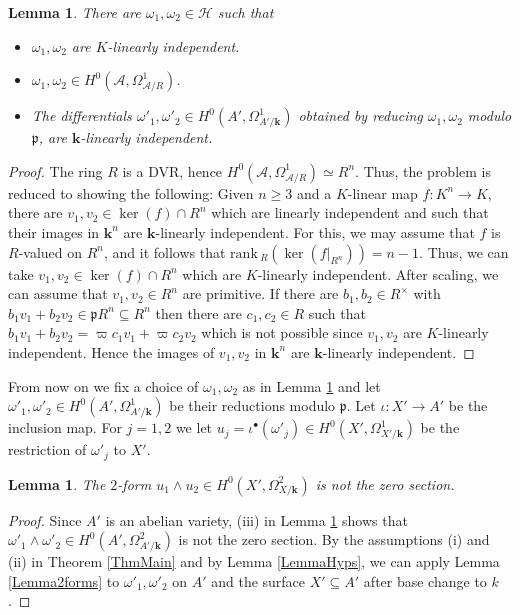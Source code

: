 \documentclass[11pt]{amsart}
\newtheorem{lemma}[theorem]{Lemma}
\theoremstyle{remark}
\numberwithin{equation}{section}
\newcommand{\pfrak}{\mathfrak{p}}
\newcommand{\Acal}{\mathscr{A}}
\newcommand{\Hcal}{\mathscr{H}}
\newcommand{\kk}{\mathbf{k}}
\newcommand{\rk}{\mathrm{rank}\,}
\begin{document}
\begin{lemma}\label{LemmaDiff1} There are $\omega_1,\omega_2\in \Hcal$ such that
\begin{itemize}
\item[(i)] $\omega_1,\omega_2$ are $K$-linearly independent.
\item[(ii)] $\omega_1,\omega_2\in H^0(\Acal,\Omega^1_{\Acal/R})$.
\item[(iii)] The differentials $\omega'_1,\omega'_2\in H^0(A',\Omega^1_{A'/\kk})$ obtained by reducing $\omega_1,\omega_2$ modulo $\pfrak$, are $\kk$-linearly independent.
\end{itemize}
\end{lemma}
\begin{proof} The ring $R$ is a DVR, hence $H^0(\Acal,\Omega^1_{\Acal/R})\simeq R^n$. Thus, the problem is reduced to showing the following: Given $n\ge 3$ and a $K$-linear map $f:K^n\to K$, there are $v_1,v_2\in \ker(f)\cap R^n$ which are linearly independent and such that their images in $\kk^n$ are $\kk$-linearly independent. For this, we may assume that $f$ is $R$-valued on $R^n$, and it follows that $\rk_R(\ker(f|_{R^n}))=n-1$. Thus, we can take $v_1,v_2\in \ker(f)\cap R^n$ which are $K$-linearly independent. After scaling, we can assume that $v_1,v_2\in R^n$ are primitive. If there are $b_1,b_2\in R^\times$ with $b_1 v_1+b_2 v_2\in \pfrak R^n\subseteq R^n$ then there are $c_1,c_2\in R$ such that $b_1 v_1+b_2 v_2=\varpi c_1 v_1+\varpi c_2v_2$ which is not possible since $v_1,v_2$ are $K$-linearly independent. Hence the images of  $v_1,v_2$ in $\kk^n$ are $\kk$-linearly independent.
\end{proof}

From now on we fix a choice of $\omega_1,\omega_2$ as in Lemma \ref{LemmaDiff1} and let $\omega'_1,\omega'_2\in H^0(A',\Omega^1_{A'/\kk})$ be their reductions modulo $\pfrak$. Let $\iota:X'\to A'$ be the inclusion map. For $j=1,2$ we let $u_j=\iota^\bullet(\omega'_j)\in H^0(X',\Omega^1_{X'/\kk})$ be the restriction of $\omega'_j$ to $X'$.

\begin{lemma}\label{LemmaDiff2} The $2$-form   $u_1\wedge u_2\in H^0(X',\Omega^2_{X/\kk})$ is not the zero section.
\end{lemma}
\begin{proof} Since $A'$ is an abelian variety,  (iii) in Lemma \ref{LemmaDiff1} shows that $\omega'_1\wedge \omega'_2\in H^0(A',\Omega^2_{A'/\kk})$ is not the zero section. By the assumptions (i) and (ii) in Theorem \ref{ThmMain} and by Lemma \ref{LemmaHyps}, we can apply Lemma \ref{Lemma2forms} to $\omega'_1,\omega'_2$ on $A'$ and the surface $X'\subseteq A'$ after base change to $k$. 
\end{proof}
\end{document}
